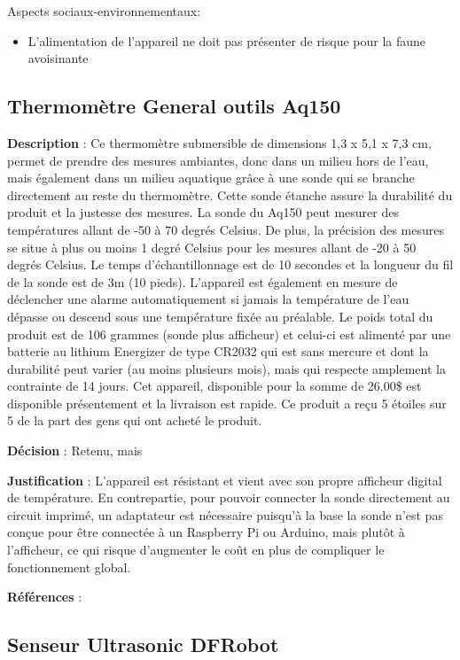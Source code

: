 Aspects sociaux-environnementaux:
\begin{itemize}
	\item L’alimentation de l’appareil ne doit pas présenter de risque pour la faune avoisinante
\end{itemize}

\subsection{Thermomètre General outils Aq150} 

\textbf{Description} : Ce thermomètre submersible de dimensions 1,3 x 5,1 x 7,3 cm, permet de prendre des mesures ambiantes, donc dans un milieu hors de l’eau, mais également dans un milieu aquatique grâce à une sonde qui se branche directement au reste du thermomètre. Cette sonde étanche assure la durabilité du produit et la justesse des mesures. La sonde du Aq150 peut mesurer des températures allant de -50 à 70 degrés Celsius. De plus, la précision des mesures se situe à plus ou moins 1 degré Celsius pour les mesures allant de -20 à 50 degrés Celsius. Le temps d’échantillonnage est de 10 secondes et la longueur du fil de la sonde est de 3m (10 pieds). L’appareil est également en mesure de déclencher une alarme automatiquement si jamais la température de l’eau dépasse ou descend sous une température fixée au préalable. Le poids total du produit est de 106 grammes (sonde plus afficheur) et celui-ci est alimenté par une batterie au lithium Energizer de type CR2032 qui est sans mercure et dont la durabilité peut varier (au moins plusieurs mois), mais qui respecte amplement la contrainte de 14 jours. Cet appareil, disponible pour la somme de 26.00\$ est disponible présentement et la livraison est rapide. Ce produit a reçu 5 étoiles sur 5 de la part des gens qui ont acheté le produit.  

\textbf{Décision} : Retenu, mais

\textbf{Justification} : L’appareil est résistant et vient avec son propre afficheur digital de température.  En contrepartie, pour pouvoir connecter la sonde directement au circuit imprimé, un adaptateur est nécessaire puisqu’à la base la sonde n’est pas conçue pour être connectée à un Raspberry Pi ou Arduino, mais plutôt à l’afficheur, ce qui risque d’augmenter le coût en plus de compliquer le fonctionnement global.

\textbf{Références} : \cite{amazonAQ150}



\subsection{Senseur Ultrasonic DFRobot} 


